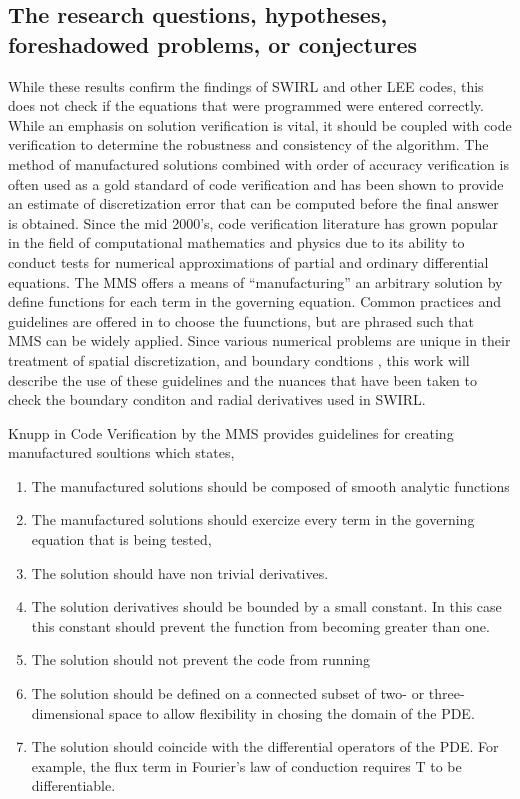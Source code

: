 \subsection{The research questions, hypotheses, foreshadowed problems, or 
    conjectures}
While these results confirm the findings of SWIRL and other LEE codes, this does not check if the 
equations that were programmed were entered correctly. While an emphasis on 
solution verification is vital, it should be coupled with code verification to
determine the robustness and consistency of the algorithm.  The method of manufactured
solutions combined with order of accuracy verification is often used as a 
gold standard of code verification \cite{Roy2005} and has been shown to provide
an estimate of discretization error that can be computed before the final answer
is obtained. Since the mid 2000's, code verification literature has grown popular
in the field of computational mathematics and physics due to its ability to
conduct tests for numerical approximations of partial and ordinary differential 
equations. The MMS offers a means of ``manufacturing'' an arbitrary solution by
define functions for each term in the governing equation.  Common practices 
and guidelines are offered in \cite{Salari2000} to choose the fuunctions, but
are phrased such that MMS can be widely applied. Since various numerical problems
are unique in their treatment of spatial discretization, and boundary condtions ,
this work will describe the use of these guidelines and the nuances that have
been taken to check the boundary conditon and radial derivatives used in SWIRL.

Knupp in Code Verification by the MMS \cite{Salari2000} provides guidelines for creating
manufactured soultions which states,
\begin{enumerate}
    \item  The manufactured solutions should be composed of smooth analytic 
        functions 
    \item The manufactured solutions should exercize every term in the governing
        equation that is being tested,
    \item The solution should have non trivial derivatives.  
    \item The solution derivatives should be bounded by a small constant. In this case
        this constant should prevent the function from becoming greater than 
        one.
    \item The solution should not prevent the code from running 
    \item The solution should be defined on a connected subset of two- or three-
        dimensional space to allow flexibility in chosing the domain of the PDE.
    \item The solution should coincide with the differential operators of the PDE.
        For example, the flux term in Fourier's law of conduction requires T to 
        be differentiable.
\end{enumerate}

